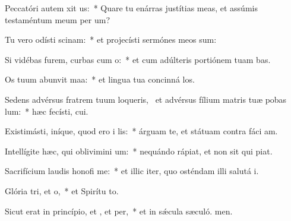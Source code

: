\item Peccatóri autem xit us:~* Quare tu enárras justítias meas, et assúmis testaméntum meum per  um?
\item Tu vero odísti scinam:~* et projecísti sermónes meos sum:
\item Si vidébas furem, curbas cum o:~* et cum adúlteris portiónem tuam bas.
\item Os tuum abunvit maa:~* et lingua tua concinná los.
\item Sedens advérsus fratrem tuum loqueris,~\pscross{} et advérsus fílium matris tuæ pobas lum:~* hæc fecísti,  cui.
\item Existimásti, iníque, quod ero i lis:~* árguam te, et státuam contra fáci am.
\item Intellígite hæc, qui oblivimini um:~* nequándo rápiat, et non sit qui piat.
\item Sacrifícium laudis honofi me:~* et illic iter, quo osténdam illi salutá i.
\item Glória tri, et o,~* et Spirítu to.
\item Sicut erat in princípio, et , et per,~* et in sǽcula sæculó. men.
